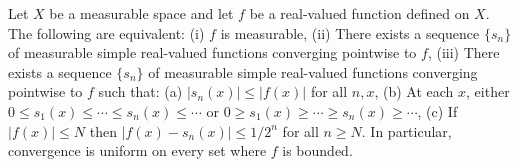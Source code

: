 Let $X$ be a measurable space and let $f$ be a real-valued function defined on $X$. The following are equivalent:
(i) $f$ is measurable,
(ii) There exists a sequence $\{s_n\}$ of measurable simple real-valued functions converging pointwise to $f$,
(iii) There exists a sequence $\{s_n\}$ of measurable simple real-valued functions converging pointwise to $f$ such that:
(a) $|s_n(x)| \leq |f(x)|$ for all $n,x$,
(b) At each $x$, either $0 \leq s_1(x) \leq \cdots \leq s_n(x) \leq \cdots$ or $0 \geq s_1(x) \geq \cdots \geq s_n(x) \geq \cdots$,
(c) If $|f(x)| \leq N$ then $|f(x) - s_n(x)| \leq 1/2^n$ for all $n \geq N$. In particular, convergence is uniform on every set where $f$ is bounded.
